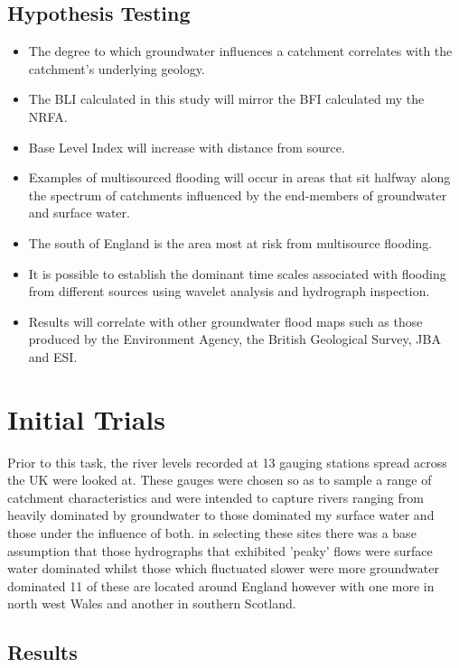 \documentclass[DIV=calc, paper=a4, fontsize=11pt, twocolumn]{scrartcl}	 %
\begin{document}
	\subsection{Hypothesis Testing}
		\begin{itemize}
			\item The degree to which groundwater influences a catchment correlates with the catchment's underlying geology.
			\item The BLI calculated in this study will mirror the BFI calculated my the NRFA.
			\item Base Level Index will increase with distance from source.
			\item Examples of multisourced flooding will occur in areas that sit halfway along the spectrum of catchments influenced by the end-members of groundwater and surface water.
			\item The south of England is the area most at risk from multisource flooding.
			\item It is possible to establish the dominant time scales associated with flooding from different sources using wavelet analysis and hydrograph inspection.
			\item Results will correlate with other groundwater flood maps such as those produced by the Environment Agency, the British Geological Survey, JBA and ESI.
		\end{itemize}

\section{Initial Trials}
Prior to this task, the river levels recorded at 13 gauging stations spread across the UK were looked at. These gauges were chosen so as to sample a range of catchment characteristics and were intended to capture rivers ranging from heavily dominated by groundwater to those dominated my surface water and those under the influence of both. in selecting these sites there was a base assumption that those hydrographs that exhibited 'peaky' flows were surface water dominated whilst those which fluctuated slower were more groundwater dominated 11 of these are located around England however with one more in north west Wales and another in southern Scotland.

	\subsection{Results}	
\end{document}
